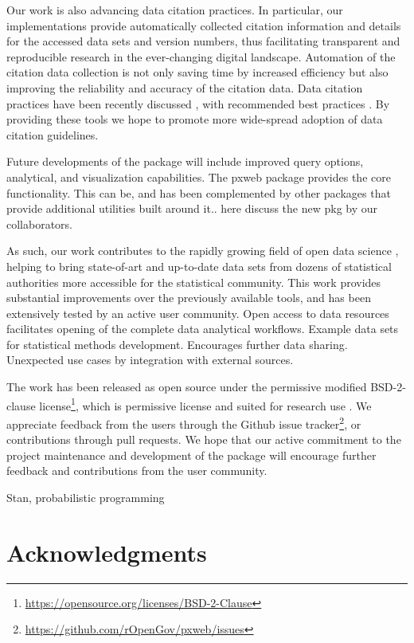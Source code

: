 Our work is also advancing data citation practices. In particular, our implementations provide automatically collected citation information and details for the accessed data sets and version numbers, thus facilitating transparent and reproducible research in the ever-changing digital landscape. Automation of the citation data collection  is not only saving time by increased efficiency but also improving the reliability and accuracy of the citation data. Data citation practices have been recently discussed \cite{xxx}, with recommended best practices \cite{xxx}. By providing these tools we hope to promote more wide-spread adoption of data citation guidelines.

Future developments of the package will include improved query options, analytical, and visualization capabilities. The pxweb package provides the core functionality. This can be, and has been complemented by other packages that provide additional utilities built around it.. here discuss the new pkg by our collaborators.

As such, our work contributes to the rapidly growing field of open data science \cite{Lahti2018IDA}, helping to bring state-of-art and up-to-date data sets from dozens of statistical authorities more accessible for the statistical community. This work provides substantial improvements over the previously available tools, and has been extensively tested by an active user community. Open access to data resources facilitates opening of the complete data analytical workflows. Example data sets for statistical methods development. Encourages further data sharing. Unexpected use cases by integration with external sources.

The work has been released as open source under the permissive modified BSD-2-clause license\footnote{\url{https://opensource.org/licenses/BSD-2-Clause}}, which is permissive license and suited for research use \cite{Morin2012}. We appreciate feedback from the users through the Github issue tracker\footnote{\url{https://github.com/rOpenGov/pxweb/issues}}, or contributions through pull requests. We hope that our active commitment to the project maintenance and development of the package will encourage further feedback and contributions from the user community.

Stan, probabilistic programming



\section*{Acknowledgments}

